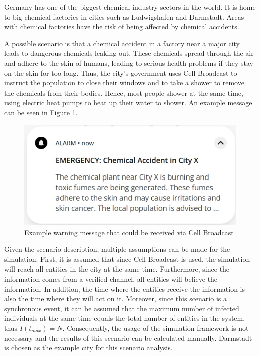 Germany has one of the biggest chemical industry sectors in the world.
It is home to big chemical factories in cities such as Ludwigshafen and
Darmstadt. Areas with chemical factories have the risk of being
affected by chemical accidents.

A possible scenario is that a chemical accident in a 
factory near a major city leads to dangerous chemicals 
leaking out. These chemicals spread through the air 
and adhere to the skin of humans, leading to serious 
health problems if they stay on the skin for too long.
Thus, the city's government uses Cell Broadcast to
instruct the population to close their windows and 
to take a shower to remove the chemicals from their bodies.
Hence, most people shower at the same time,
using electric heat pumps to heat up their water to shower.
An example message can be seen in Figure \ref{warningmessage}.

\begin{figure}[!ht]
    \center
    \includegraphics[scale=.7]{figs/emergencychemical.png}
    \caption{Example warning message that could be received via Cell Broadcast}
    \label{warningmessage}
\end{figure}

Given the scenario description, multiple assumptions can be
made for the simulation.
First, it is assumed that since Cell Broadcast is used, the simulation
will reach all entities in the city at the same time.
Furthermore, since the information comes from a verified channel,
all entities will believe the information. In addition, the time where the
entities receive the information is also the time where they will act
on it.
Moreover, since this scenario is a synchronous event, it can be 
assumed that the
maximum number of infected individuals at the same time equals
the total number of entities in the system, thus $I(t_{max})=N$.
Consequently, the usage of the simulation framework is not necessary
and the results of this scenario can be calculated manually.
Darmstadt is chosen as the example city for this scenario analysis.

